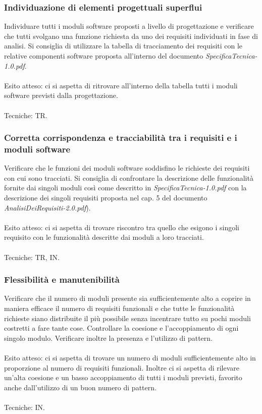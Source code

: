 \subsubsection{Individuazione di elementi progettuali superflui}

Individuare tutti i moduli software proposti a livello di progettazione e
verificare che tutti svolgano una funzione richiesta da uno dei requisiti individuati in fase
di analisi. Si consiglia di utilizzare la tabella di tracciamento dei requisiti
con le relative componenti software proposta all'interno del documento
\emph{SpecificaTecnica-1.0.pdf}.
\\\\
Esito atteso: ci si aspetta di ritrovare all'interno della tabella tutti i
moduli software previsti dalla progettazione.
\\\\
Tecniche: TR.

\subsubsection{Corretta corrispondenza e tracciabilit\`a tra i requisiti e i
moduli software}

Verificare che le funzioni dei moduli software soddisfino le richieste dei
requisiti con cui sono tracciati. Si consiglia di confrontare la descrizione
delle funzionalit\`a fornite dai singoli moduli cos\`i come descritto in
\emph{SpecificaTecnica-1.0.pdf} con la descrizione dei singoli requisiti
proposta nel cap. 5 del documento \emph{AnalisiDeiRequisiti-2.0.pdf}).
\\\\
Esito atteso: ci si aspetta di trovare riscontro tra quello che esigono i
singoli requisito con le funzionalit\`a descritte dai moduli a loro tracciati.
\\\\
Tecniche: TR, IN.


\subsubsection{Flessibilit\`a e manutenibilit\`a}

Verificare che il numero di moduli presente sia sufficientemente alto a coprire
in maniera efficace il numero di requisiti funzionali e che tutte le
funzionalit\`a richieste siano distribuite il pi\`u possibile senza incentrare
tutto su pochi moduli costretti a fare tante cose. Controllare la coesione e
l'accoppiamento di ogni singolo modulo. Verificare inoltre la presenza e
l'utilizzo di pattern.
\\\\
Esito atteso: ci si aspetta di trovare un numero di moduli sufficientemente alto
in proporzione al numero di requisiti funzionali. Inoltre ci si aspetta di
rilevare un'alta coesione e un basso accoppiamento di tutti i moduli previsti,
favorito anche dall'utilizzo di un buon numero di pattern. 
\\\\
Tecniche: IN.

